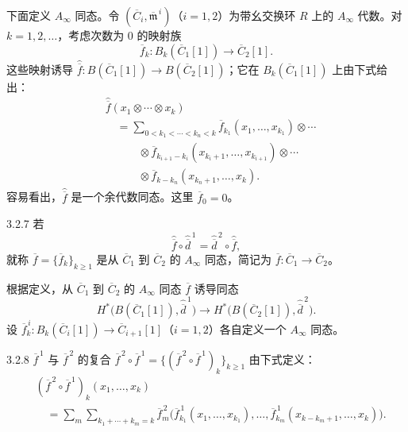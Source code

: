 下面定义 $A_\infty$ 同态。令
$(\overline C_i,\overline{\mathfrak m}^{\,i})$（$i=1,2$）为带幺交换环
$R$ 上的 $A_\infty$ 代数。对 $k=1,2,\ldots$，考虑次数为 $0$ 的映射族
\[
  \overline f_k\colon B_k(\overline C_1[1])
  \longrightarrow\overline C_2[1].
\]
这些映射诱导
$\widehat{\overline f}\colon B(\overline C_1[1])\to
B(\overline C_2[1])$；它在 $B_k(\overline C_1[1])$ 上由下式给出：
\begin{equation}
\begin{aligned}
  &\widehat{\overline f}(x_1\otimes\cdots\otimes x_k)\\
  &\quad={}
  \sum_{0<k_1<\cdots<k_n<k}
  \overline f_{k_1}(x_1,\ldots,x_{k_1})\otimes\cdots\\
  &\qquad\quad{}\otimes
  \overline f_{k_{i+1}-k_i}
  (x_{k_i+1},\ldots,x_{k_{i+1}})\otimes\cdots\\
  &\qquad\quad{}\otimes
  \overline f_{k-k_n}(x_{k_n+1},\ldots,x_k).
\end{aligned}
\tag{3.2.6}\label{eq:3-2-6}
\end{equation}
容易看出，$\widehat{\overline f}$ 是一个余代数同态。这里
$\overline f_0=0$。

\begin{definition}{3.2.7}\label{def:3-2-7}
若
\[
  \widehat{\overline f}\circ\widehat{\overline d}^{\,1}
  =\widehat{\overline d}^{\,2}\circ\widehat{\overline f},
\]
就称 $\overline f=\{\overline f_k\}_{k\geq1}$ 是从
$\overline C_1$ 到 $\overline C_2$ 的
$A_\infty$ 同态，简记为
$\overline f\colon\overline C_1\to\overline C_2$。
\end{definition}

根据定义，从 $\overline C_1$ 到 $\overline C_2$ 的 $A_\infty$ 同态
$\overline f$ 诱导同态
\[
  H^*\bigl(B(\overline C_1[1]),\widehat{\overline d}^{\,1}\bigr)
  \longrightarrow
  H^*\bigl(B(\overline C_2[1]),\widehat{\overline d}^{\,2}\bigr).
\]
设
$\overline f_k^{\,i}\colon B_k(\overline C_i[1])\to
\overline C_{i+1}[1]$（$i=1,2$）各自定义一个 $A_\infty$ 同态。

\begin{definition}{3.2.8}\label{def:3-2-8}
$\overline f^{\,1}$ 与 $\overline f^{\,2}$ 的复合
$\overline f^{\,2}\circ\overline f^{\,1}
=\{(\overline f^{\,2}\circ\overline f^{\,1})_k\}_{k\geq1}$
由下式定义：
\[
\begin{aligned}
  &(\overline f^{\,2}\circ\overline f^{\,1})_k
  (x_1,\ldots,x_k)\\
  &\quad={}
  \sum_m\sum_{k_1+\cdots+k_m=k}
  \overline f_m^{\,2}\bigl(
    \overline f_{k_1}^{\,1}(x_1,\ldots,x_{k_1}),\ldots,
    \overline f_{k_m}^{\,1}(x_{k-k_m+1},\ldots,x_k)
  \bigr).
\end{aligned}
\]
\end{definition}

